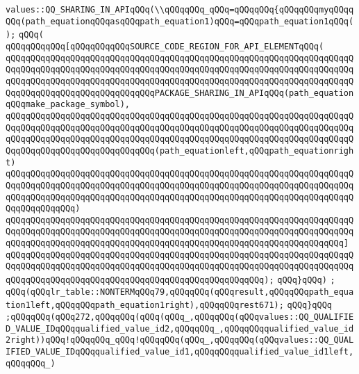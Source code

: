 \verb|values::QQ_SHARING_IN_APIqQQq(\\qQQqqQQq_qQQq=qQQqqQQq{qQQqqQQqmyqQQqqQQq(path_equationqQQqasqQQqpath_equation1)qQQq=qQQqpath_equation1qQQq();|\newline
\verb|qQQq(|\newline
\verb|qQQqqQQqqQQq[qQQqqQQqqQQqSOURCE_CODE_REGION_FOR_API_ELEMENTqQQq(|\newline
\verb|qQQqqQQqqQQqqQQqqQQqqQQqqQQqqQQqqQQqqQQqqQQqqQQqqQQqqQQqqQQqqQQqqQQqqQQqqQQqqQQqqQQqqQQqqQQqqQQqqQQqqQQqqQQqqQQqqQQqqQQqqQQqqQQqqQQqqQQqqQQqqQQqqQQqqQQqqQQqqQQqqQQqqQQqqQQqqQQqqQQqqQQqqQQqqQQqqQQqqQQqqQQqqQQqqQQqqQQqqQQqqQQqqQQqqQQqqQQqqQQqPACKAGE_SHARING_IN_APIqQQq(path_equationqQQqmake_package_symbol),|\newline
\verb|qQQqqQQqqQQqqQQqqQQqqQQqqQQqqQQqqQQqqQQqqQQqqQQqqQQqqQQqqQQqqQQqqQQqqQQqqQQqqQQqqQQqqQQqqQQqqQQqqQQqqQQqqQQqqQQqqQQqqQQqqQQqqQQqqQQqqQQqqQQqqQQqqQQqqQQqqQQqqQQqqQQqqQQqqQQqqQQqqQQqqQQqqQQqqQQqqQQqqQQqqQQqqQQqqQQqqQQqqQQqqQQqqQQqqQQqqQQqqQQq(path_equationleft,qQQqpath_equationright)|\newline
\verb|qQQqqQQqqQQqqQQqqQQqqQQqqQQqqQQqqQQqqQQqqQQqqQQqqQQqqQQqqQQqqQQqqQQqqQQqqQQqqQQqqQQqqQQqqQQqqQQqqQQqqQQqqQQqqQQqqQQqqQQqqQQqqQQqqQQqqQQqqQQqqQQqqQQqqQQqqQQqqQQqqQQqqQQqqQQqqQQqqQQqqQQqqQQqqQQqqQQqqQQqqQQqqQQqqQQqqQQqqQQqqQQq)|\newline
\verb|qQQqqQQqqQQqqQQqqQQqqQQqqQQqqQQqqQQqqQQqqQQqqQQqqQQqqQQqqQQqqQQqqQQqqQQqqQQqqQQqqQQqqQQqqQQqqQQqqQQqqQQqqQQqqQQqqQQqqQQqqQQqqQQqqQQqqQQqqQQqqQQqqQQqqQQqqQQqqQQqqQQqqQQqqQQqqQQqqQQqqQQqqQQqqQQqqQQqqQQqqQQqqQQq]|\newline
\verb|qQQqqQQqqQQqqQQqqQQqqQQqqQQqqQQqqQQqqQQqqQQqqQQqqQQqqQQqqQQqqQQqqQQqqQQqqQQqqQQqqQQqqQQqqQQqqQQqqQQqqQQqqQQqqQQqqQQqqQQqqQQqqQQqqQQqqQQqqQQqqQQqqQQqqQQqqQQqqQQqqQQqqQQqqQQqqQQqqQQqqQQqqQQqqQQq);|\newline
\verb|qQQq}qQQq)|\newline
\verb|;|\newline
\verb|qQQq(qQQqlr_table::NONTERMqQQq79,qQQqqQQq(qQQqresult,qQQqqQQqpath_equation1left,qQQqqQQqpath_equation1right),qQQqqQQqrest671);|\newline
\verb|qQQq}qQQq|\newline
\verb|;qQQqqQQq(qQQq272,qQQqqQQq(qQQq(qQQq_,qQQqqQQq(qQQqvalues::QQ_QUALIFIED_VALUE_IDqQQqqualified_value_id2,qQQqqQQq_,qQQqqQQqqualified_value_id2right))qQQq!qQQqqQQq_qQQq!qQQqqQQq(qQQq_,qQQqqQQq(qQQqvalues::QQ_QUALIFIED_VALUE_IDqQQqqualified_value_id1,qQQqqQQqqualified_value_id1left,qQQqqQQq_)|\newline
